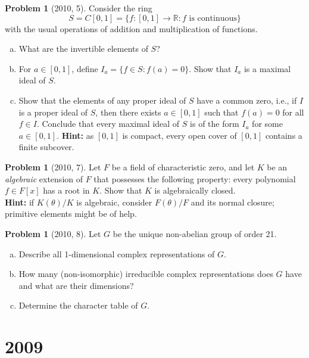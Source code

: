 \documentclass{article}
\newcommand{\<}{\langle} %
\renewcommand{\>}{\rangle} %
\theoremstyle{plain}
\theoremstyle{remark}
\theoremstyle{definition}
\newtheorem{examproblem}[equation]{Problem}
\begin{document}
\begin{examproblem}[2010, 5]
	Consider the ring
	$$
	S=C[0,1]=\{f:[0,1]\rightarrow\mathbb R:f\text{ is continuous}\}
	$$
	with the usual operations of addition and multiplication of functions.
	\begin{enumerate}[(a)]
		\item What are the invertible elements of $S$?
		\item For $a\in[0,1]$, define $I_a=\{f\in S:f(a)=0\}$.
			Show that $I_a$ is a maximal ideal of $S$.
		\item Show that the elements of any proper ideal of $S$ have a
			common zero, i.e., if $I$ is a proper ideal of $S$, then
			there exists $a\in[0,1]$ such that $f(a)=0$ for all $f\in I$.
			Conclude that every maximal ideal of $S$ is of the form
			$I_a$ for some $a\in[0,1]$. \textbf{Hint:} as $[0,1]$
			is compact, every open cover of $[0,1]$ contains a finite
			subcover.
	\end{enumerate}
\end{examproblem}

\begin{examproblem}[2010, 7]
	Let $F$ be a field of characteristic zero, and let $K$
	be an \textit{algebraic} extension of $F$ that possesses the following
	property: every polynomial $f\in F[x]$ has a root in $K$.
	Show that $K$ is algebraically closed.\\
	\textbf{Hint:} if $K(\theta)/K$ is algebraic, consider $F(\theta)/F$
	and its normal closure; primitive elements might be of help.
\end{examproblem}


\begin{examproblem}[2010, 8]
	Let $G$ be the unique non-abelian group of order 21.
	\begin{enumerate}[(a)]
		\item Describe all 1-dimensional complex representations of $G$.
		\item How many (non-isomorphic) irreducible complex representations
			does $G$ have and what are their dimensions?
		\item Determine the character table of $G$.
	\end{enumerate}
\end{examproblem}

\newpage

\section{2009}
\end{document}
